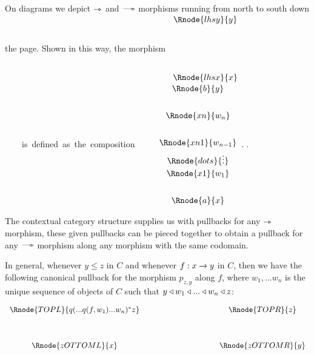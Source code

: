 On diagrams we depict $\rightarrowtriangle$  and $\dmorph$ morphisms running from north to south down the page.
Shown in this way, the morphism
$
\begin{array} {c}
\Rnode{lhsy}{y} \\[2.0cm]
\Rnode{lhsx}{x}  \\ 
\end{array}
$
 \mbox{\ \ \ \ is defined as the composition\ \ \ \ } 
$
\begin{array}{c}
\Rnode{b}{y}\\[0.7cm]
\Rnode{xn}{w_n}\\[0.7cm]
\Rnode{xn1}{w_{n-1}}\\[0.1cm]
\Rnode{dots}{\vdots}\\[0.1cm]
\Rnode{x1}{w_1}\\[0.7cm]
\Rnode{a}{x} 
\end{array}
$.
.

\note
The contextual category structure supplies us with pullbacks for any $\rightarrowtriangle$ morphism, 
these given pullbacks can be pieced together to obtain a pullback for
any $\dmorph$ morphism  along any morphism with the same codomain. 

In general, whenever $y \leq z$ in $C$ and whenever $f:x \rightarrow y$ in $C$, then we have
the following canonical pullback for the morphism $p_{z, y}$ along $f$, where
$w_1, ... w_n$ is the unique sequence of objects of $C$ such that 
$y \triangleleft w_1 \triangleleft ... \triangleleft w_n \triangleleft z$:

\vspace{3mm}
\begin{center}
\begin{equation}
\label{compositepullbackdefinition}
\begin{array}{cp{2.9cm}c}
\Rnode{TOPL}{q(...q(f, w_1)...w_n)^* z} & & \Rnode{TOPR}{z}\\ [1.2cm]
\Rnode{zOTTOML}{x}         & & \Rnode{zOTTOMR}{y}
\end{array}
\end{equation}
\end{center}

